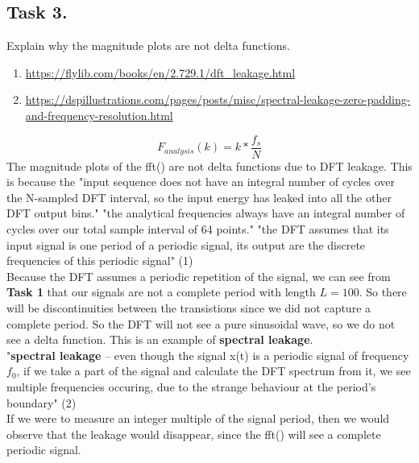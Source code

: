 \documentclass{article}
\begin{document}
    \subsection{Task 3.} Explain why the magnitude plots are not delta functions.\\
        \vspace{5mm}
        \begin{enumerate}
            \item\url{https://flylib.com/books/en/2.729.1/dft_leakage.html}
            \item\url{https://dspillustrations.com/pages/posts/misc/spectral-leakage-zero-padding-and-frequency-resolution.html}
        \end{enumerate}
        \begin{equation}
            F_{analysis}(k)=k*\frac{f_s}{N}
        \end{equation}
        The magnitude plots of the fft() are not delta functions due to DFT leakage. This is because the "input sequence does not have an integral number of cycles over the N-sampled DFT interval, so the input energy has leaked into all the other DFT output bins."
        \newline
        "the analytical frequencies always have an integral number of cycles over our total sample interval of 64 points."
        \newline
        "the DFT assumes that its input signal is one period of a periodic signal, its output are the discrete frequencies of this periodic signal" (1)\\
        \vspace{5mm}
        Because the DFT assumes a periodic repetition of the signal, we can see from \textbf{Task 1} that our signals are not a complete period with length $L=100$. So there will be discontinuities between the transistions since we did not capture a complete period. So the DFT will not see a pure sinusoidal wave, so we do not see a delta function. This is an example of \textbf{spectral leakage}.\\
        \vspace{5mm}
        "\textbf{spectral leakage} -- even though the signal x(t) is a periodic signal of frequency $f_0$, if we take a part of the signal and calculate the DFT spectrum from it, we see multiple frequencies occuring, due to the strange behaviour at the period's boundary" (2)\\
        \vspace{5mm}
        If we were to measure an integer multiple of the signal period, then we would observe that the leakage would disappear, since the fft() will see a complete periodic signal.
    \pagebreak
\end{document}
